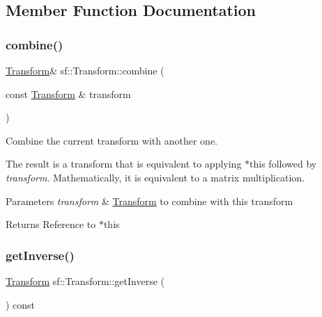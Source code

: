\subsection{Member Function Documentation}
\mbox{\label{classsf_1_1_transform_acd978f60421a0f839bb9a8263e8877ff}} 
\subsubsection{\texorpdfstring{combine()}{combine()}}
{\footnotesize\ttfamily \hyperlink{classsf_1_1_transform}{Transform}\& sf\+::\+Transform\+::combine (\begin{DoxyParamCaption}\item[{const \hyperlink{classsf_1_1_transform}{Transform} \&}]{transform }\end{DoxyParamCaption})}



Combine the current transform with another one. 

The result is a transform that is equivalent to applying $\ast$this followed by {\itshape transform}. Mathematically, it is equivalent to a matrix multiplication.


\begin{DoxyParams}{Parameters}
{\em transform} & \hyperlink{classsf_1_1_transform}{Transform} to combine with this transform\\
\hline
\end{DoxyParams}
\begin{DoxyReturn}{Returns}
Reference to $\ast$this 
\end{DoxyReturn}
\mbox{\label{classsf_1_1_transform_a14f49e81af44aabcff7611f6703a1e4a}} 
\subsubsection{\texorpdfstring{get\+Inverse()}{getInverse()}}
{\footnotesize\ttfamily \hyperlink{classsf_1_1_transform}{Transform} sf\+::\+Transform\+::get\+Inverse (\begin{DoxyParamCaption}{ }\end{DoxyParamCaption}) const}




